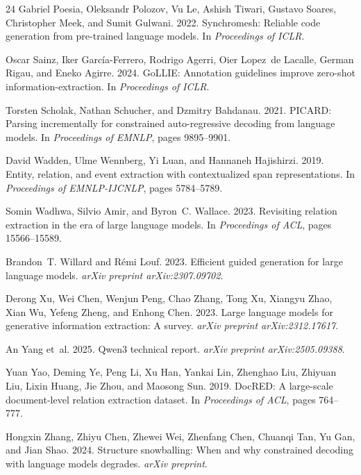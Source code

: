 \documentclass[11pt]{article}
\begin{document}
\begin{thebibliography}{24}
Gabriel Poesia, Oleksandr Polozov, Vu Le, Ashish Tiwari, Gustavo Soares, Christopher Meek, and Sumit Gulwani. 2022.
\newblock Synchromesh: Reliable code generation from pre-trained language models.
\newblock In \textit{Proceedings of ICLR}.

Oscar Sainz, Iker Garc\'ia-Ferrero, Rodrigo Agerri, Oier Lopez~de Lacalle, German Rigau, and Eneko Agirre. 2024.
\newblock GoLLIE: Annotation guidelines improve zero-shot information-extraction.
\newblock In \textit{Proceedings of ICLR}.

Torsten Scholak, Nathan Schucher, and Dzmitry Bahdanau. 2021.
\newblock PICARD: Parsing incrementally for constrained auto-regressive decoding from language models.
\newblock In \textit{Proceedings of EMNLP}, pages 9895--9901.

David Wadden, Ulme Wennberg, Yi Luan, and Hannaneh Hajishirzi. 2019.
\newblock Entity, relation, and event extraction with contextualized span representations.
\newblock In \textit{Proceedings of EMNLP-IJCNLP}, pages 5784--5789.

Somin Wadhwa, Silvio Amir, and Byron~C. Wallace. 2023.
\newblock Revisiting relation extraction in the era of large language models.
\newblock In \textit{Proceedings of ACL}, pages 15566--15589.

Brandon~T. Willard and R\'emi Louf. 2023.
\newblock Efficient guided generation for large language models.
\newblock \textit{arXiv preprint arXiv:2307.09702}.

Derong Xu, Wei Chen, Wenjun Peng, Chao Zhang, Tong Xu, Xiangyu Zhao, Xian Wu, Yefeng Zheng, and Enhong Chen. 2023.
\newblock Large language models for generative information extraction: A survey.
\newblock \textit{arXiv preprint arXiv:2312.17617}.

An Yang et~al. 2025.
\newblock Qwen3 technical report.
\newblock \textit{arXiv preprint arXiv:2505.09388}.

Yuan Yao, Deming Ye, Peng Li, Xu Han, Yankai Lin, Zhenghao Liu, Zhiyuan Liu, Lixin Huang, Jie Zhou, and Maosong Sun. 2019.
\newblock DocRED: A large-scale document-level relation extraction dataset.
\newblock In \textit{Proceedings of ACL}, pages 764--777.

Hongxin Zhang, Zhiyu Chen, Zhewei Wei, Zhenfang Chen, Chuanqi Tan, Yu Gan, and Jian Shao. 2024.
\newblock Structure snowballing: When and why constrained decoding with language models degrades.
\newblock \textit{arXiv preprint}.

\end{thebibliography}
\end{document}
